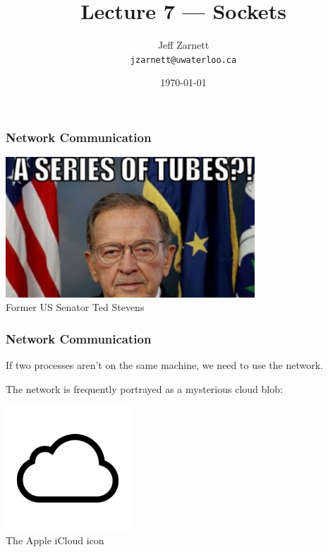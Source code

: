 

\title{Lecture 7 --- Sockets }

\author{Jeff Zarnett \\ \small \texttt{jzarnett@uwaterloo.ca}}
\date{\today}




\begin{frame}
  \titlepage

 \end{frame}


\begin{frame}
\frametitle{Network Communication}

\begin{center}
	\includegraphics[width=0.7\textwidth]{images/seriesoftubes.jpg}\\
	Former US Senator Ted Stevens
\end{center}


\end{frame}


\begin{frame}
\frametitle{Network Communication}

If two processes aren't on the same machine, we need to use the network.

The network is frequently portrayed as a mysterious cloud blob:

\begin{center}
	\includegraphics[width=0.35\textwidth]{images/iCloud.png}\\
	The Apple iCloud icon
\end{center}

\end{frame}


